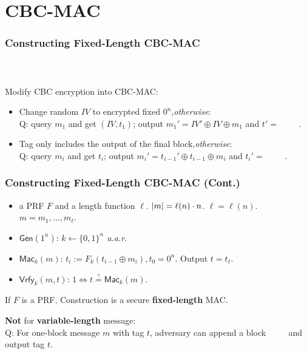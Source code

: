 \section{CBC-MAC}
\begin{frame}\frametitle{Constructing Fixed-Length CBC-MAC}
\begin{columns}[C]
\begin{figure}
\begin{center}

\end{center}
\end{figure}
\begin{figure}
\begin{center}

\end{center}
\end{figure}
\end{columns}
Modify CBC encryption into CBC-MAC:
\begin{itemize}
\item Change random $IV$ to encrypted fixed $0^{n}$,\emph{otherwise}:\\
\alert{Q: query $m_1$ and get $(IV, t_1)$; output $m_1' = IV' \oplus  IV \oplus m_{1}$ and $t' =$ \underline{$\qquad $}.} %
\item Tag only includes the output of the final block,\emph{otherwise}:\\
\alert{Q: query $m_i$ and get $t_i$; output $m_i' = t_{i-1}' \oplus t_{i-1} \oplus m_{i}$ and $t_{i}' = $ \underline{$\qquad$}.}%
\end{itemize}
\end{frame}
\begin{frame}\frametitle{Constructing Fixed-Length CBC-MAC (Cont.)}
\begin{construction}
\begin{itemize}
\item a PRF $F$ and a length function $\ell$. $\lvert m\rvert = \ell(n)\cdot n$.
$\ell=\ell(n)$. $m = m_1,\dotsc,m_{\ell}$.
\item $\mathsf{Gen}(1^n)$: $k \gets \{0,1\}^n$ \emph{u.a.r}.
\item $\mathsf{Mac}_k(m)$: $t_i := F_k(t_{i-1}\oplus m_i), t_0=0^n$. Output $t = t_\ell$.
\item $\mathsf{Vrfy}_k(m,t)$: $1 \iff t \overset{?}{=} \mathsf{Mac}_k(m)$.
\end{itemize}
\end{construction}
\begin{theorem}
If $F$ is a PRF, Construction is a secure \textbf{fixed-length} MAC.
\end{theorem}
\textbf{Not} for \textbf{variable-length} message:\\
\alert{Q: For one-block message $m$ with tag $t$, adversary can append a block \underline{$\qquad$} and output tag $t$.} %
\end{frame}
